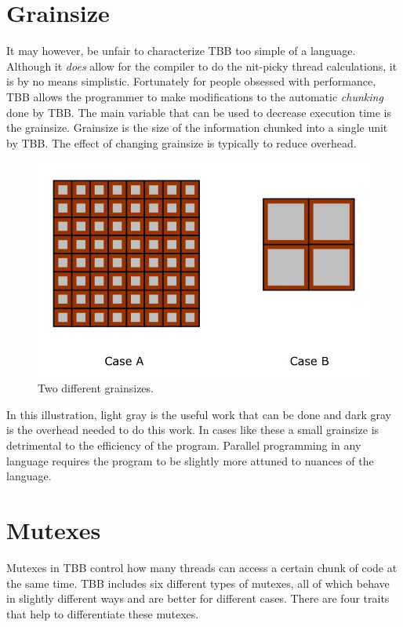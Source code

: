 \documentclass{article}
\begin{document}
  \section{Grainsize}

  It may however, be unfair to characterize TBB too simple of a language. Although it \emph{does} allow for the compiler to do the nit-picky thread calculations, it is by no means simplistic. Fortunately for people obsessed with performance, TBB allows the programmer to make modifications to the automatic \emph{chunking} done by TBB. The main variable that can be used to decrease execution time is the grainsize. Grainsize is the size of the information chunked into a single unit by TBB. The effect of changing grainsize is typically to reduce overhead.

  \begin{figure}[H]
  \centering
  \includegraphics[scale=.65]{pic/Grainsize.jpg}
  \caption{Two different grainsizes.}
  \end{figure}

  In this illustration, light gray is the useful work that can be done and dark gray is the overhead needed to do this work. In cases like these a small grainsize is detrimental to the efficiency of the program. Parallel programming in any language requires the program to be slightly more attuned to nuances of the language.


  \section{Mutexes}
  Mutexes in TBB control how many threads can access a certain chunk of code at the same time. TBB includes six different types of mutexes, all of which behave in slightly different ways and are better for different cases. There are four traits that help to differentiate these mutexes. 
\end{document}
